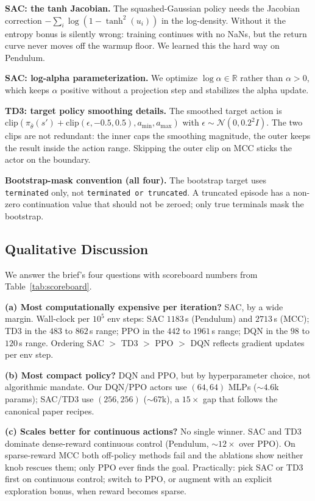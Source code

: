 \documentclass{article}
\begin{document}
\textbf{SAC: the tanh Jacobian.} The squashed-Gaussian policy needs the Jacobian correction $-\sum_i \log(1 - \tanh^{2}(u_i))$ in the log-density. Without it the entropy bonus is silently wrong: training continues with no NaNs, but the return curve never moves off the warmup floor. We learned this the hard way on Pendulum.

\textbf{SAC: log-alpha parameterization.} We optimize $\log \alpha \in \mathbb{R}$ rather than $\alpha > 0$, which keeps $\alpha$ positive without a projection step and stabilizes the alpha update.

\textbf{TD3: target policy smoothing details.} The smoothed target action is $\mathrm{clip}(\pi_{\bar{\theta}}(s') + \mathrm{clip}(\epsilon, -0.5, 0.5), a_{\min}, a_{\max})$ with $\epsilon \sim \mathcal{N}(0, 0.2^{2} I)$. The two clips are not redundant: the inner caps the smoothing magnitude, the outer keeps the result inside the action range. Skipping the outer clip on MCC sticks the actor on the boundary.

\textbf{Bootstrap-mask convention (all four).} The bootstrap target uses \texttt{terminated} only, not \texttt{terminated or truncated}. A truncated episode has a non-zero continuation value that should not be zeroed; only true terminals mask the bootstrap.

\subsection{Qualitative Discussion}
\label{sec:discussion}

We answer the brief's four questions with scoreboard numbers from Table~\ref{tab:scoreboard}.

\textbf{(a) Most computationally expensive per iteration?} SAC, by a wide margin. Wall-clock per $10^{5}$ env steps: SAC $1183$\,s (Pendulum) and $2713$\,s (MCC); TD3 in the $483$ to $862$\,s range; PPO in the $442$ to $1961$\,s range; DQN in the $98$ to $120$\,s range. Ordering SAC $>$ TD3 $>$ PPO $>$ DQN reflects gradient updates per env step.

\textbf{(b) Most compact policy?} DQN and PPO, but by hyperparameter choice, not algorithmic mandate. Our DQN/PPO actors use $(64,64)$ MLPs ($\sim 4.6$k params); SAC/TD3 use $(256,256)$ ($\sim 67$k), a $15\times$ gap that follows the canonical paper recipes.

\textbf{(c) Scales better for continuous actions?} No single winner. SAC and TD3 dominate dense-reward continuous control (Pendulum, $\sim 12\times$ over PPO). On sparse-reward MCC both off-policy methods fail and the ablations show neither knob rescues them; only PPO ever finds the goal. Practically: pick SAC or TD3 first on continuous control; switch to PPO, or augment with an explicit exploration bonus, when reward becomes sparse.
\end{document}
